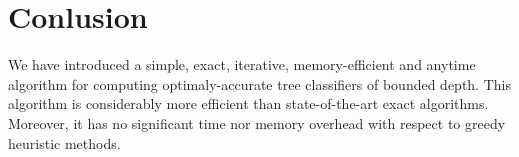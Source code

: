 \documentclass{llncs}
\begin{document}
% 


\section{Conlusion}

We have introduced a simple, exact, iterative, memory-efficient and anytime algorithm for computing optimaly-accurate tree classifiers of bounded depth.
This algorithm is considerably more efficient than state-of-the-art exact algorithms. Moreover, it has no significant time nor memory overhead with respect to greedy heuristic methods.




\end{document}
